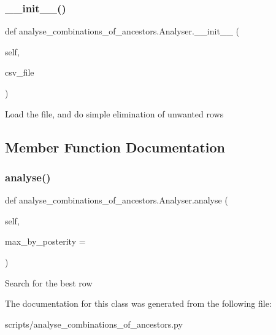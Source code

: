 \subsubsection{\texorpdfstring{\+\_\+\+\_\+init\+\_\+\+\_\+()}{\_\_init\_\_()}}
{\footnotesize\ttfamily def analyse\+\_\+combinations\+\_\+of\+\_\+ancestors.\+Analyser.\+\_\+\+\_\+init\+\_\+\+\_\+ (\begin{DoxyParamCaption}\item[{}]{self,  }\item[{}]{csv\+\_\+file }\end{DoxyParamCaption})}

\begin{DoxyVerb}Load the file, and do simple elimination of unwanted rows
\end{DoxyVerb}
 

\subsection{Member Function Documentation}
\mbox{\label{classanalyse__combinations__of__ancestors_1_1Analyser_a2bb7870a20c9c9d6d701556b92787059}} 
\subsubsection{\texorpdfstring{analyse()}{analyse()}}
{\footnotesize\ttfamily def analyse\+\_\+combinations\+\_\+of\+\_\+ancestors.\+Analyser.\+analyse (\begin{DoxyParamCaption}\item[{}]{self,  }\item[{}]{max\+\_\+by\+\_\+posterity = {} }\end{DoxyParamCaption})}

\begin{DoxyVerb}Search for the best row
\end{DoxyVerb}
 

The documentation for this class was generated from the following file\+:\begin{DoxyCompactItemize}
\item 
scripts/analyse\+\_\+combinations\+\_\+of\+\_\+ancestors.\+py\end{DoxyCompactItemize}
